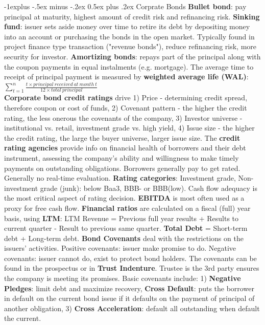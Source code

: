\documentclass[10pt,landscape]{article}
\makeatletter
\renewcommand{\subsection}{\@startsection{subsection}{2}{0mm}%
                                {-1explus -.5ex minus -.2ex}%
                                {0.5ex plus .2ex}%
                                {\normalfont\normalsize\bfseries}}
\makeatother
\begin{document}
\begin{multicols}{3}
\subsection{Corprate Bonds}
{\bf Bullet bond}: pay principal at maturity, highest amount of credit risk and refinancing risk. {\bf Sinking fund}: issuer sets aside money over time to retire its debt by depositing money into an account or purchasing the bonds in the open market. Typically found in project finance type transaction ("revenue bonds"), reduce refinancing risk, more security for investor. {\bf Amortizing bonds}: repays part of the principal along with the coupon payments in equal instalments (e.g. mortgage). The average time to receipt of principal payment is measured by {\bf weighted average life (WAL)}: $\sum_{t=1}^{n} \frac{t \times principal\ received\ at\ month\ t}{12 \times total\ principal}$\\
{\bf Corporate bond credit ratings} drive 1) Price - determining credit spread, therefore coupon or cost of funds, 2) Covenant pattern - the higher the credit rating, the less onerous the covenants of the company, 3) Investor universe - institutional vs. retail, investment grade vs. high yield, 4) Issue size - the higher the credit rating, the large the buyer universe, larger issue size. The {\bf credit rating agencies} provide info on financial health of borrowers and their debt instrument, assessing the company's ability and willingness to make timely payments on outstanding obligations. Borrowers generally pay to get rated. Generally no real-time evaluation. {\bf Rating categories}: Investment grade, Non-investment grade (junk): below Baa3, BBB- or BBB(low). Cash flow adequacy is the most critical aspect of rating decision. {\bf EBITDA} is most often used as a proxy for free cash flow. {\bf Financial ratios} are calculated on a fiscal (full) year basis, using {\bf LTM}: LTM Revenue = Previous full year results + Results to current quarter - Result to previous same quarter. {\bf Total Debt} = Short-term debt + Long-term debt.
{\bf Bond Covenants} deal with the restrictions on the issuers' activities. Positive covenants: issuer make promise to do. Negative covenants: issuer cannot do, exist to protect bond holders. The covenants can be found in the prospectus or in {\bf Trust Indenture}. Trustee is the 3rd party ensures the company is meeting its promises. Basic covenants include: 1) {\bf Negative Pledges}: limit debt and maximize recovery, {\bf Cross Default}: puts the borrower in default on the current bond issue if it defaults on the payment of principal of another obligation, 3) {\bf Cross Acceleration}: default all outstanding when default the current. \\

\end{multicols}
\end{document}
